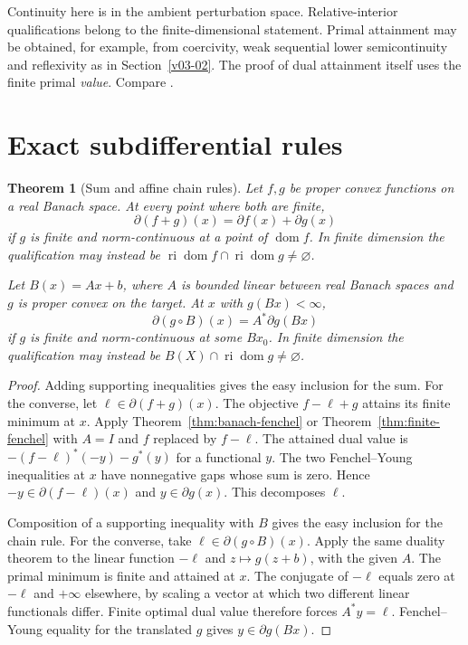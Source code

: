 \documentclass[11pt,oneside,openany]{book}
\theoremstyle{plain}
\newtheorem{theorem}{Theorem}[chapter]
\theoremstyle{definition}
\theoremstyle{remark}
\begin{document}
Continuity here is in the ambient perturbation space.
Relative-interior qualifications belong to the finite-dimensional
statement. Primal attainment may be obtained, for example,
from coercivity, weak sequential lower semicontinuity and
reflexivity as in Section~\ref{v03-02}. The proof of dual
attainment itself uses the finite primal \emph{value}.
Compare \cite[Chapter III, Propositions 2.1--2.4 and
Theorem 4.1]{EkelandTemam}.

\section{Exact subdifferential rules}
\label{v04-04}

\begin{theorem}[Sum and affine chain rules]\label{thm:exact-subdiff}
Let \(f,g\) be proper convex functions on a real Banach
space. At every point where both are finite,
\[
 \partial(f+g)(x)=\partial f(x)+\partial g(x)
\]
if \(g\) is finite and norm-continuous at a point of
\(\operatorname{dom}f\). In finite dimension the
qualification may instead be
\(\operatorname{ri}\operatorname{dom}f\cap
\operatorname{ri}\operatorname{dom}g\ne\varnothing\).

Let \(B(x)=Ax+b\), where \(A\) is bounded linear between
real Banach spaces and \(g\) is proper convex on the target.
At \(x\) with \(g(Bx)<\infty\),
\[
 \partial(g\circ B)(x)=A^*\partial g(Bx)
\]
if \(g\) is finite and norm-continuous at some \(Bx_0\).
In finite dimension the qualification may instead be
\(B(X)\cap\operatorname{ri}\operatorname{dom}g\ne\varnothing\).
\end{theorem}

\begin{proof}
Adding supporting inequalities gives the easy inclusion
for the sum. For the converse, let \(\ell\in\partial(f+g)(x)\).
The objective \(f-\ell+g\) attains its finite minimum at \(x\).
Apply Theorem~\ref{thm:banach-fenchel} or
Theorem~\ref{thm:finite-fenchel} with \(A=I\) and \(f\)
replaced by \(f-\ell\). The attained dual value is
\(- (f-\ell)^*(-y)-g^*(y)\) for a functional \(y\).
The two Fenchel--Young inequalities at \(x\) have
nonnegative gaps whose sum is zero. Hence
\(-y\in\partial(f-\ell)(x)\) and \(y\in\partial g(x)\).
This decomposes \(\ell\).

Composition of a supporting inequality with \(B\) gives
the easy inclusion for the chain rule. For the converse,
take \(\ell\in\partial(g\circ B)(x)\). Apply the same
duality theorem to the linear function \(-\ell\) and
\(z\mapsto g(z+b)\), with the given \(A\).
The primal minimum is finite and attained at \(x\).
The conjugate of \(-\ell\) equals zero at \(-\ell\)
and \(+\infty\) elsewhere, by scaling a vector at which
two different linear functionals differ.
Finite optimal dual value therefore forces \(A^*y=\ell\).
Fenchel--Young equality for the translated \(g\) gives
\(y\in\partial g(Bx)\).
\end{proof}
\end{document}
